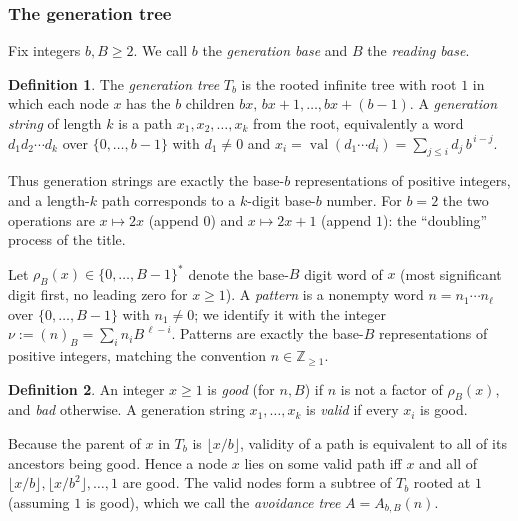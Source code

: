 \documentclass[a4paper]{article}
\theoremstyle{plain}
\theoremstyle{definition}
\newtheorem{definition}{Definition}[subsection]
\theoremstyle{remark}
\DeclareMathOperator{\val}{val}
\newcommand{\base}[2]{(#1)_{#2}}
\newcommand{\ZZ}{\mathbb{Z}}
\begin{document}
\subsubsection{The generation tree}

Fix integers $b,B\ge 2$. We call $b$ the \emph{generation base} and $B$ the \emph{reading base}.

\begin{definition}
The \emph{generation tree} $T_b$ is the rooted infinite tree with root $1$ in which each node $x$ has the $b$ children $bx,\,bx+1,\dots,bx+(b-1)$. A \emph{generation string} of length $k$ is a path $x_1,x_2,\dots,x_k$ from the root, equivalently a word $d_1d_2\cdots d_k$ over $\{0,\dots,b-1\}$ with $d_1\neq 0$ and $x_i=\val(d_1\cdots d_i)=\sum_{j\le i} d_j\,b^{\,i-j}$.
\end{definition}

Thus generation strings are exactly the base-$b$ representations of positive integers, and a length-$k$ path corresponds to a $k$-digit base-$b$ number. For $b=2$ the two operations are $x\mapsto 2x$ (append $0$) and $x\mapsto 2x+1$ (append $1$): the ``doubling'' process of the title.

Let $\rho_B(x)\in\{0,\dots,B-1\}^{*}$ denote the base-$B$ digit word of $x$ (most significant digit first, no leading zero for $x\ge 1$). A \emph{pattern} is a nonempty word $n=n_1\cdots n_\ell$ over $\{0,\dots,B-1\}$ with $n_1\neq 0$; we identify it with the integer $\nu:=\base{n}{B}=\sum_{i}n_i B^{\,\ell-i}$. Patterns are exactly the base-$B$ representations of positive integers, matching the convention $n\in\ZZ_{\ge1}$.

\begin{definition}
An integer $x\ge 1$ is \emph{good} (for $n,B$) if $n$ is not a factor of $\rho_B(x)$, and \emph{bad} otherwise. A generation string $x_1,\dots,x_k$ is \emph{valid} if every $x_i$ is good.
\end{definition}

Because the parent of $x$ in $T_b$ is $\lfloor x/b\rfloor$, validity of a path is equivalent to all of its ancestors being good. Hence a node $x$ lies on some valid path iff $x$ and all of $\lfloor x/b\rfloor,\lfloor x/b^2\rfloor,\dots,1$ are good. The valid nodes form a subtree of $T_b$ rooted at $1$ (assuming $1$ is good), which we call the \emph{avoidance tree} $A=A_{b,B}(n)$.
\end{document}
